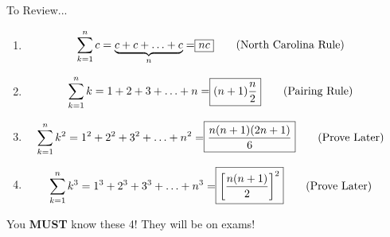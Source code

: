 \documentclass[../../Main.tex]{subfiles}
\begin{document}
To Review...

\begin{enumerate}
    \item 
        \begin{align*}
            \sum_{k = 1}^{n} c = \underbrace{c + c + \ldots + c}_{n} = \Aboxed{nc} \tag{North Carolina Rule}
        \end{align*}

    \item 
        \begin{align*}
            \sum_{k = 1}^{n} k = 1 + 2 + 3 + \ldots + n = \Aboxed{(n + 1) \frac{n}{2}} \tag{Pairing Rule}
        \end{align*}

    \item 
        \begin{align*}
            \sum_{k = 1}^{n} k^2 = 1^2 + 2^2 + 3^2 + \ldots + n^2 = \Aboxed{\frac{n(n + 1)(2n + 1)}{6}} \tag{Prove Later}
        \end{align*}

    \item
        \begin{align*}
            \sum_{k = 1}^{n} k^3 = 1^3 + 2^3 + 3^3 + \ldots + n^3 = \Aboxed{\left[ \frac{n(n + 1)}{2} \right]^2} \tag{Prove Later}
        \end{align*}

\end{enumerate}

You \textbf{MUST} know these 4! They will be on exams!
\end{document}

